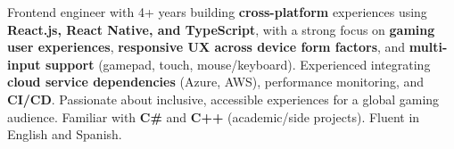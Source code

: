 
\begin{cvparagraph}
Frontend engineer with 4+ years building \textbf{cross-platform} experiences using \textbf{React.js, React Native, and TypeScript}, with a strong focus on \textbf{gaming user experiences}, \textbf{responsive UX across device form factors}, and \textbf{multi-input support} (gamepad, touch, mouse/keyboard). Experienced integrating \textbf{cloud service dependencies} (Azure, AWS), performance monitoring, and \textbf{CI/CD}. Passionate about inclusive, accessible experiences for a global gaming audience. Familiar with \textbf{C\#} and \textbf{C++} (academic/side projects). Fluent in English and Spanish.
\end{cvparagraph}
